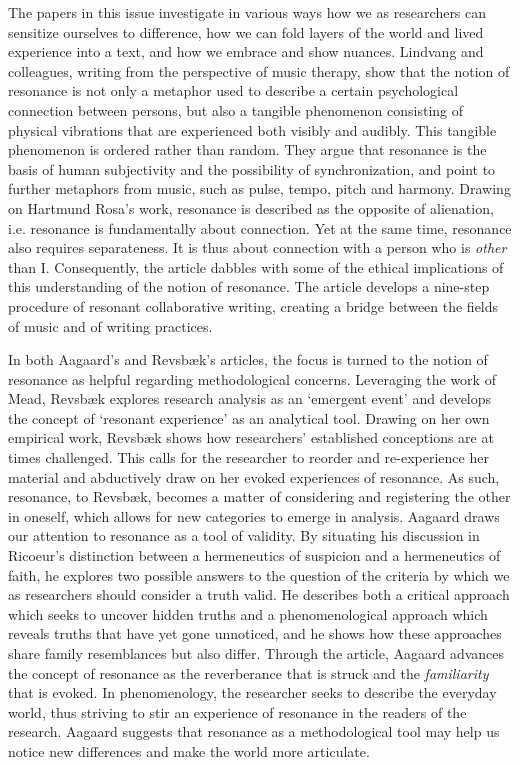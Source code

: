 The papers in this issue investigate in various ways how we as researchers can sensitize ourselves to difference, how we can fold layers of the world and lived experience into a text, and how we embrace and show nuances. Lindvang and colleagues, writing from the perspective of music therapy, show that the notion of resonance is not only a metaphor used to describe a certain psychological connection between persons, but also a tangible phenomenon consisting of physical vibrations that are experienced both visibly and audibly. This tangible phenomenon is ordered rather than random. They argue that resonance is the basis of human subjectivity and the possibility of synchronization, and point to further metaphors from music, such as pulse, tempo, pitch and harmony. Drawing on Hartmund Rosa’s work, resonance is described as the opposite of alienation, i.e. resonance is fundamentally about connection. Yet at the same time, resonance also requires separateness. It is thus about connection with a person who is \textit{other} than I. Consequently, the article dabbles with some of the ethical implications of this understanding of the notion of resonance. The article develops a nine-step procedure of resonant collaborative writing, creating a bridge between the fields of music and of writing practices.
\par
In both Aagaard’s and Revsbæk’s articles, the focus is turned to the notion of resonance as helpful regarding methodological concerns. Leveraging the work of Mead, Revsbæk explores research analysis as an ‘emergent event’ and develops the concept of ‘resonant experience’ as an analytical tool. Drawing on her own empirical work, Revsbæk shows how researchers’ established conceptions are at times challenged. This calls for the researcher to reorder and re-experience her material and abductively draw on her evoked experiences of resonance. As such, resonance, to Revsbæk, becomes a matter of considering and registering the other in oneself, which allows for new categories to emerge in analysis.  Aagaard draws our attention to resonance as a tool of validity. By situating his discussion in Ricoeur’s distinction between a hermeneutics of suspicion and a hermeneutics of faith, he explores two possible answers to the question of the criteria by which we as researchers should consider a truth valid. He describes both a critical approach which seeks to uncover hidden truths and a phenomenological approach which reveals truths that have yet gone unnoticed, and he shows how these approaches share family resemblances but also differ. Through the article, Aagaard advances the concept of resonance as the reverberance that is struck and the \textit{familiarity} that is evoked. In phenomenology, the researcher seeks to describe the everyday world, thus striving to stir an experience of resonance in the readers of the research. Aagaard suggests that resonance as a methodological tool may help us notice new differences and make the world more articulate. 
